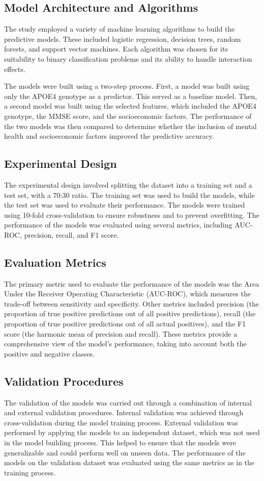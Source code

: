 \documentclass[conference]{IEEEtran}
\begin{document}
\subsection{Model Architecture and Algorithms}
The study employed a variety of machine learning algorithms to build the predictive models. These included logistic regression, decision trees, random forests, and support vector machines. Each algorithm was chosen for its suitability to binary classification problems and its ability to handle interaction effects.

The models were built using a two-step process. First, a model was built using only the APOE4 genotype as a predictor. This served as a baseline model. Then, a second model was built using the selected features, which included the APOE4 genotype, the MMSE score, and the socioeconomic factors. The performance of the two models was then compared to determine whether the inclusion of mental health and socioeconomic factors improved the predictive accuracy.

\subsection{Experimental Design}
The experimental design involved splitting the dataset into a training set and a test set, with a 70:30 ratio. The training set was used to build the models, while the test set was used to evaluate their performance. The models were trained using 10-fold cross-validation to ensure robustness and to prevent overfitting. The performance of the models was evaluated using several metrics, including AUC-ROC, precision, recall, and F1 score.

\subsection{Evaluation Metrics}
The primary metric used to evaluate the performance of the models was the Area Under the Receiver Operating Characteristic (AUC-ROC), which measures the trade-off between sensitivity and specificity. Other metrics included precision (the proportion of true positive predictions out of all positive predictions), recall (the proportion of true positive predictions out of all actual positives), and the F1 score (the harmonic mean of precision and recall). These metrics provide a comprehensive view of the model's performance, taking into account both the positive and negative classes.

\subsection{Validation Procedures}
The validation of the models was carried out through a combination of internal and external validation procedures. Internal validation was achieved through cross-validation during the model training process. External validation was performed by applying the models to an independent dataset, which was not used in the model building process. This helped to ensure that the models were generalizable and could perform well on unseen data. The performance of the models on the validation dataset was evaluated using the same metrics as in the training process.
\end{document}
